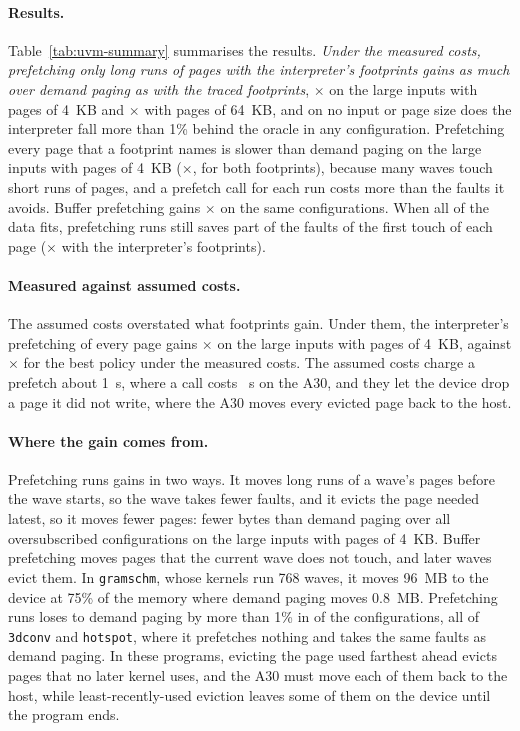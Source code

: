 \documentclass[11pt]{article}
\newcommand{\tabref}[1]{Table~\ref{#1}}
\newcommand{\code}[1]{\texttt{#1}}
\begin{document}
\paragraph{Results.} \tabref{tab:uvm-summary} summarises the results. \textit{Under the measured costs, prefetching
only long runs of pages with the interpreter's footprints gains as much over demand paging as with the traced
footprints}, \numUvmWLargeFourHyMin{}$\times$ on the large inputs with pages of 4~KB and
\numUvmWLargeHyMin{}$\times$ with pages of 64~KB, and on no input or page size does the interpreter fall more than
1\% behind the oracle in any configuration. Prefetching every page that a footprint names is slower than demand
paging on the large inputs with pages of 4~KB (\numUvmWLargeFourHy{}$\times$, for both footprints), because many
waves touch short runs of pages, and a prefetch call for each run costs more than the faults it avoids. Buffer
prefetching gains \numUvmWLargeFourBuf{}$\times$ on the same configurations. When all of the data fits,
prefetching runs still saves part of the faults of the first touch of each page (\numUvmWLargeFourFitHyMin{}$\times$
with the interpreter's footprints).

\paragraph{Measured against assumed costs.} The assumed costs overstated what footprints gain. Under them, the
interpreter's prefetching of every page gains \numUvmWLargeFourAssumedHy{}$\times$ on the large inputs with pages of
4~KB, against \numUvmWLargeFourHyMin{}$\times$ for the best policy under the measured costs. The assumed costs charge
a prefetch about 1~\textmu s, where a call costs \numUvmPrefetchCallUs{}~\textmu s on the A30, and they let the
device drop a page it did not write, where the A30 moves every evicted page back to the host.

\paragraph{Where the gain comes from.} Prefetching runs gains in two ways. It moves long runs of a wave's pages
before the wave starts, so the wave takes fewer faults, and it evicts the page needed latest, so it moves fewer
pages: \numUvmWLargeFourHyMinFewerBytes{} fewer bytes than demand paging over all oversubscribed configurations on
the large inputs with pages of 4~KB. Buffer prefetching moves pages that the current wave does not touch, and later
waves evict them. In \code{gramschm}, whose kernels run 768 waves, it moves 96~MB to the device at 75\% of the
memory where demand paging moves 0.8~MB. Prefetching runs loses to demand paging by more than 1\% in
\numUvmWLargeFourHyMinLoses{} of the \numUvmWLargeFourConfigs{} configurations, all of \code{3dconv} and
\code{hotspot}, where it prefetches nothing and takes the same faults as demand paging. In these programs,
evicting the page used farthest ahead evicts pages that no later kernel uses, and the A30 must move each of them
back to the host, while least-recently-used eviction leaves some of them on the device until the program ends.
\end{document}
